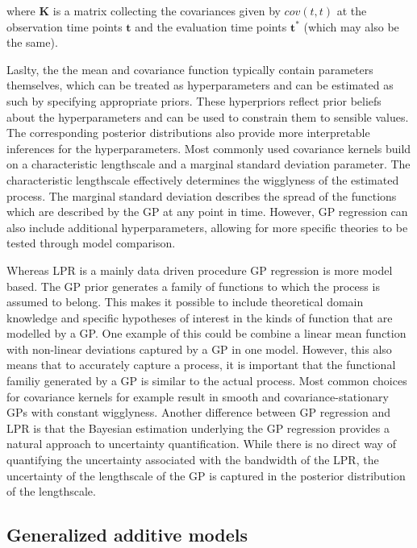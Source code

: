 \documentclass[man, floatsintext]{apa7}
\begin{document}
\noindent where $\textbf{K}$ is a matrix collecting the covariances given by
$cov(t, t)$ at the observation time points $\textbf{t}$ and the evaluation time
points $\textbf{t}^*$ (which may also be the same).

Laslty, the the mean and covariance function typically contain parameters
themselves, which can be treated as hyperparameters and can be estimated as
such by specifying appropriate priors. These hyperpriors reflect prior beliefs
about the hyperparameters and can be used to constrain them to sensible values.
The corresponding posterior distributions also provide more interpretable
inferences for the hyperparameters. Most commonly used covariance kernels build
on a characteristic lengthscale and a marginal standard deviation parameter.
The characteristic lengthscale effectively determines the wigglyness of the
estimated process. The marginal standard deviation describes the spread of the
functions which are described by the GP at any point in time. However, GP
regression can also include additional hyperparameters, allowing for more
specific theories to be tested through model comparison.

Whereas LPR is a mainly data driven procedure GP regression is more model
based. The GP prior generates a family of functions to which the process is
assumed to belong. This makes it possible to include theoretical domain
knowledge and specific hypotheses of interest in the kinds of function that are
modelled by a GP\@. One example of this could be combine a linear mean function
with non-linear deviations captured by a GP in one model. However, this
also means that to accurately capture a process, it is important that the
functional familiy generated by a GP is similar to the actual process. Most
common choices for covariance kernels for example result in smooth and
covariance-stationary GPs with constant wigglyness. Another difference between
GP regression and LPR is that the Bayesian estimation underlying the GP
regression provides a natural approach to uncertainty quantification. While
there is no direct way of quantifying the uncertainty associated with the
bandwidth of the LPR, the uncertainty of the lengthscale of the GP is
captured in the posterior distribution of the lengthscale.

\subsection{Generalized additive models}
\end{document}
